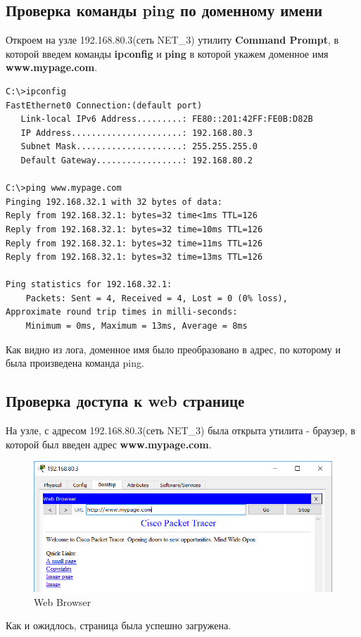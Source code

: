 \documentclass[14pt,a4paper,report]{report}
\begin{document}
\subsection{Проверка команды ping по доменному имени}
Откроем на узле 192.168.80.3(сеть NET\_3) утилиту \textbf{Command Prompt}, в которой введем команды \textbf{ipconfig} и \textbf{ping} в которой укажем доменное имя \textbf{www.mypage.com}.
\begin{lstlisting}[language={}]
C:\>ipconfig
FastEthernet0 Connection:(default port)
   Link-local IPv6 Address.........: FE80::201:42FF:FE0B:D82B
   IP Address......................: 192.168.80.3
   Subnet Mask.....................: 255.255.255.0
   Default Gateway.................: 192.168.80.2

C:\>ping www.mypage.com
Pinging 192.168.32.1 with 32 bytes of data:
Reply from 192.168.32.1: bytes=32 time<1ms TTL=126
Reply from 192.168.32.1: bytes=32 time=10ms TTL=126
Reply from 192.168.32.1: bytes=32 time=11ms TTL=126
Reply from 192.168.32.1: bytes=32 time=13ms TTL=126

Ping statistics for 192.168.32.1:
    Packets: Sent = 4, Received = 4, Lost = 0 (0% loss),
Approximate round trip times in milli-seconds:
    Minimum = 0ms, Maximum = 13ms, Average = 8ms
\end{lstlisting}
Как видно из лога, доменное имя было преобразовано в адрес, по которому и была произведена команда ping.

\subsection{Проверка доступа к web странице}
На узле, с адресом 192.168.80.3(сеть NET\_3) была открыта утилита - браузер, в которой был введен адрес \textbf{www.mypage.com}.
\begin{figure}[h]
  \centering
  \includegraphics[width=.8\textwidth]{img/web}
  \caption{Web Browser}
\end{figure}
Как и ожидлось, страница была успешно загружена.
\end{document}
